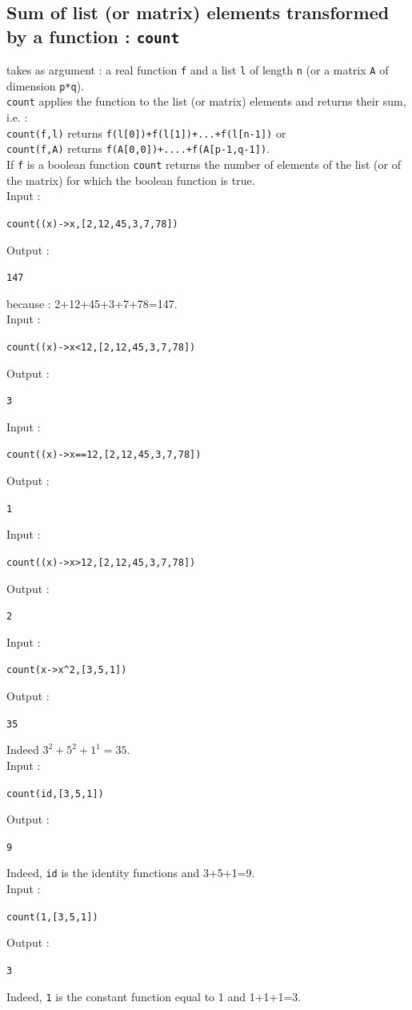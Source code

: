 \documentclass[a4paper,11pt]{book}
\begin{document}
\subsection{Sum of list (or matrix) elements 
transformed by a function : {\tt count}}
 takes as argument : a real function {\tt f} and a list 
{\tt l} of length {\tt n} (or a matrix {\tt A} of dimension {\tt p*q}).\\
{\tt count} applies the function to the list (or matrix) elements and returns 
their sum, i.e. :\\
{\tt count(f,l)} returns {\tt f(l[0])+f(l[1])+...+f(l[n-1])} or\\
{\tt count(f,A)} returns {\tt f(A[0,0])+....+f(A[p-1,q-1])}.\\
If {\tt f} is a boolean  function {\tt count} returns the number of elements 
of the list (or of the matrix) for which the boolean function is true.\\
Input :
\begin{center}{\tt count((x)->x,[2,12,45,3,7,78])}\end{center}
Output :
\begin{center}{\tt  147}\end{center}
because : 2+12+45+3+7+78=147.\\
Input :
\begin{center}{\tt count((x)->x<12,[2,12,45,3,7,78])}\end{center}
Output :
\begin{center}{\tt  3}\end{center}
Input :
\begin{center}{\tt count((x)->x==12,[2,12,45,3,7,78])}\end{center}
Output :
\begin{center}{\tt  1}\end{center}
Input :
\begin{center}{\tt count((x)->x>12,[2,12,45,3,7,78])}\end{center}
Output :
\begin{center}{\tt  2}\end{center}
Input :
\begin{center}{\tt count(x->x\verb|^|2,[3,5,1])}\end{center}
Output :
\begin{center}{\tt 35}\end{center}
Indeed $3^2+5^2+1^1=35$.\\
Input :
\begin{center}{\tt count(id,[3,5,1])}\end{center}
Output :
\begin{center}{\tt 9}\end{center}
Indeed, {\tt id} is the identity functions and  3+5+1=9.\\
Input :
\begin{center}{\tt count(1,[3,5,1])}\end{center}
Output :
\begin{center}{\tt 3}\end{center}
Indeed, {\tt 1} is the constant function equal to 1 and 1+1+1=3.
\end{document}
